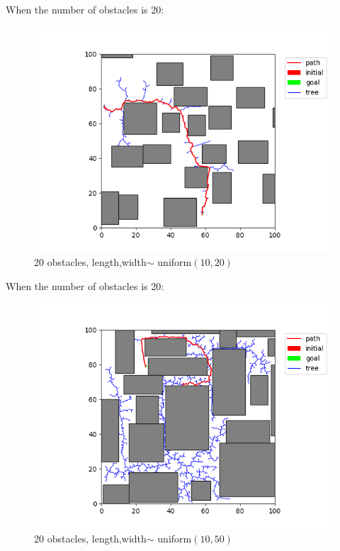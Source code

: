 \documentclass[12pt,a4paper]{article}
\begin{document}
When the number of obstacles is 20:
\begin{figure}[H]
\centering

\includegraphics[scale=.45]{20.png}
\caption{20 obstacles, length,width$\sim$ uniform$(10,20)$}
\end{figure}

When the number of obstacles is 20:
\begin{figure}[H]
\centering

\includegraphics[scale=.45]{20_2.png}
\caption{20 obstacles, length,width$\sim$ uniform$(10,50)$}
\end{figure}
\end{document}
